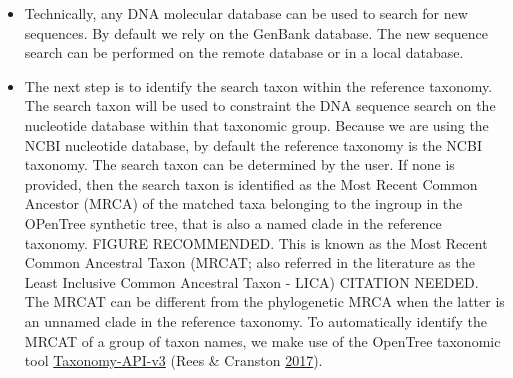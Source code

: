 \documentclass[]{article}
\begin{document}
\begin{itemize}
\item
  Technically, any DNA molecular database can be used to search for new sequences.
  By default we rely on the GenBank database.
  The new sequence search can be performed on the remote database or in a local database.
\item
  The next step is to identify the search taxon within the reference taxonomy. The search taxon will be used to constraint the DNA sequence search on the nucleotide database within that taxonomic group. Because we are using the NCBI nucleotide database, by default the reference taxonomy is the NCBI taxonomy. The search taxon can be determined by the user. If none is provided, then the search taxon is identified as the Most Recent Common Ancestor (MRCA) of the
  matched taxa belonging to the ingroup in the OPenTree synthetic tree, that is also a named clade in the reference taxonomy. FIGURE RECOMMENDED. This is known as the Most Recent Common
  Ancestral Taxon (MRCAT; also referred in the literature as the Least Inclusive Common Ancestral Taxon - LICA) CITATION NEEDED.
  The MRCAT can be different from the phylogenetic MRCA when the latter is an unnamed clade in the reference taxonomy.
  To automatically identify the MRCAT of a group of taxon names, we make use of the OpenTree taxonomic tool \href{https://github.com/OpenTreeOfLife/germinator/wiki/Taxonomy-API-v3\#mrca}{Taxonomy-API-v3} (Rees \& Cranston \protect\hyperlink{ref-rees2017automated}{2017}).


\end{itemize}
\end{document}
